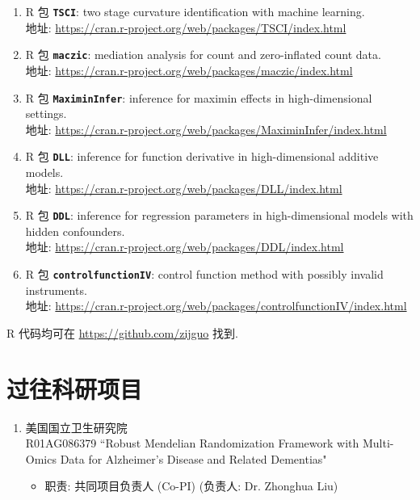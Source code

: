 \documentclass[margin, line]{res}
\begin{document}
\begin{resume}
\begin{enumerate}
            \item {R 包} \texttt{\bf TSCI}: two stage curvature identification with
                machine learning. \\ 地址: \url{https://cran.r-project.org/web/packages/TSCI/index.html}

            \item {R 包} \texttt{\bf maczic}: mediation analysis for count and zero-inflated
                count data. \\ 地址: \url{https://cran.r-project.org/web/packages/maczic/index.html}

            \item {R 包} \texttt{\bf MaximinInfer}: inference for maximin effects
                in high-dimensional settings. \\ 地址: \url{https://cran.r-project.org/web/packages/MaximinInfer/index.html}

            \item {R 包} \texttt{\bf DLL}: inference for function derivative in high-dimensional
                additive models. \\ 地址: \url{https://cran.r-project.org/web/packages/DLL/index.html}

            \item {R 包} \texttt{\bf DDL}: inference for regression parameters in
                high-dimensional models with hidden confounders. \\ 地址: \url{https://cran.r-project.org/web/packages/DDL/index.html}
            
            \item {R 包} \texttt{\bf controlfunctionIV}: control function method with
                possibly invalid instruments. \\ 地址: \url{https://cran.r-project.org/web/packages/controlfunctionIV/index.html}
            
        \end{enumerate}
			
		R 代码均可在 \url{https://github.com/zijguo} 找到.

		\section{\sc 过往科研项目}
        \begin{enumerate}
            \setlength{\itemsep}{3pt}

            \item 美国国立卫生研究院\\ R01AG086379 ``Robust Mendelian
                Randomization Framework with Multi-Omics Data for Alzheimer's Disease
                and Related Dementias"
                \begin{itemize}
                    \item[-] {职责: 共同项目负责人 (Co-PI)} (负责人: Dr. Zhonghua Liu)
                \end{itemize}


\end{enumerate}
\end{resume}
\end{document}
